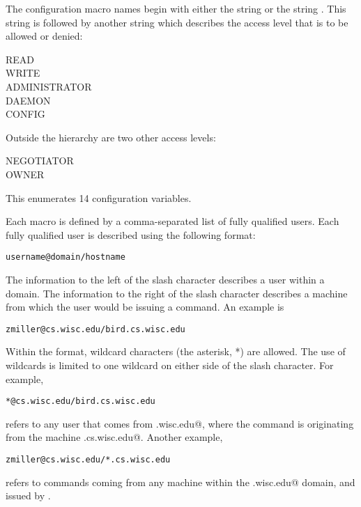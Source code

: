 The configuration macro names
begin with either the string
 or the string .
This string is followed by another string which describes
the access level that is to be allowed or denied:
\begin{description}
    \item[READ]
    \item[WRITE]
    \item[ADMINISTRATOR]
    \item[DAEMON]
    \item[CONFIG]
\end{description}
Outside the hierarchy are two other access levels:
\begin{description}
    \item[NEGOTIATOR]
    \item[OWNER]
\end{description}
This enumerates 14 configuration variables.


Each macro is defined by a comma-separated list of fully qualified
users.
Each
fully qualified user
is described using the following format:
\begin{verbatim}
username@domain/hostname
\end{verbatim}
The information to the left of the slash character describes
a user within a domain.
The information to the right of the slash character describes
a machine from which the user would be issuing a command. 
An example is
\begin{verbatim}
zmiller@cs.wisc.edu/bird.cs.wisc.edu
\end{verbatim}

Within the format, wildcard characters (the asterisk, *) are allowed.
The use of wildcards is limited to one wildcard on either side
of the slash character.
For example,
\begin{verbatim}
*@cs.wisc.edu/bird.cs.wisc.edu
\end{verbatim}
refers to any user that comes from \verb@cs.wisc.edu@,
where the command is originating from the machine
\verb@bird.cs.wisc.edu@.
Another example,
\begin{verbatim}
zmiller@cs.wisc.edu/*.cs.wisc.edu
\end{verbatim}
refers to commands coming from any machine within the 
\verb@cs.wisc.edu@ domain, and issued by \verb@zmiller@.

